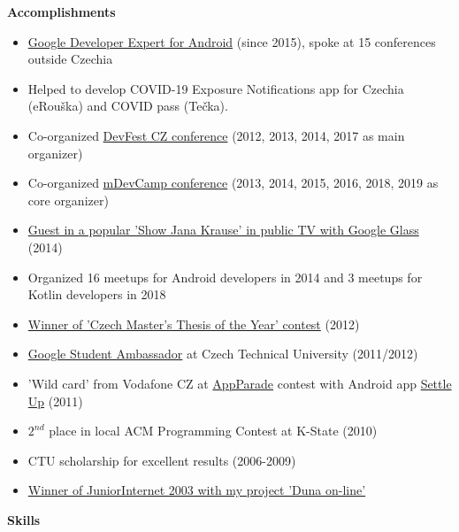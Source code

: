\documentclass[letterpaper,11pt]{article}
\newcommand{\resheading}[1]{{\large \colorbox{mygrey}{\begin{minipage}{\textwidth}{\textbf{#1 \vphantom{p\^{E}}}}\end{minipage}}}}
\begin{document}
	
\resheading{Accomplishments}
\begin{itemize}
	\item
	\href{https://developers.google.com/experts/}{Google Developer Expert for Android} (since 2015), spoke at 15 conferences outside Czechia
	\item Helped to develop COVID-19 Exposure Notifications app for Czechia (eRouška) and COVID pass (Tečka).
	\item{Co-organized \href{http://www.devfest.cz/}{DevFest CZ conference} (2012, 2013, 2014, 2017 as main organizer)}
	\item{Co-organized \href{http://www.mdevcamp.eu/}{mDevCamp conference} (2013, 2014, 2015, 2016, 2018, 2019 as core organizer)}
	\item
	\href{https://www.youtube.com/watch?v=6z3ScqblqFk}{Guest in a popular 'Show Jana Krause' in public TV with Google Glass} (2014)
	\item Organized 16 meetups for Android developers in 2014 and 3 meetups for Kotlin developers in 2018
	\item \href{http://www.diplomovaprace.cz/}{Winner of 'Czech Master's Thesis of the Year' contest} (2012)
	\item  \href{http://www.google.com/intl/en/jobs/students/proscho/programs/emea/ambassador/}{Google Student Ambassador} at Czech Technical University (2011/2012)
	\item 'Wild card' from Vodafone CZ at \href{http://www.mediar.cz/treti-prehlidku-appparade-ovladly-aplikace-pro-android-zvitezil-night-walker-tomase-zveriny/}{AppParade} contest with Android app \href{https://market.android.com/details?id=cz.destil.settleup}{Settle Up} (2011)
	\item $2^{nd}$ place in local ACM Programming Contest at K-State (2010) 
	\item CTU scholarship for excellent results (2006-2009)
	\item \href{http://www.juniorinternet.cz/winners/307/david-vavra.aspx}{Winner of JuniorInternet 2003 with my project 'Duna on-line'}
\end{itemize}	
	
\resheading{Skills}
\end{document}
